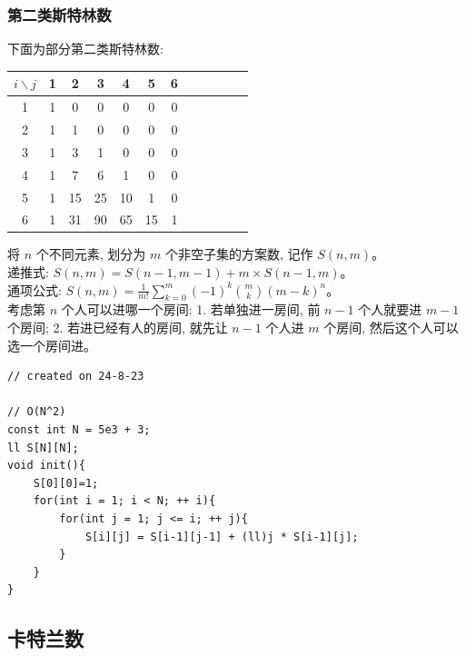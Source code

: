 \documentclass[a4paper,12pt]{article}
\begin{document}
\subsubsection{第二类斯特林数}

\noindent 下面为部分第二类斯特林数:

\begin{table}[ht]
    \centering
    \begin{tabular}{c|ccccccccccc}
      \( i \backslash j \) & 1 & 2 & 3 & 4 & 5 & 6 \\
      \hline
      1 & 1 & 0 & 0 & 0 & 0 & 0 \\
      2 & 1 & 1 & 0 & 0 & 0 & 0\\
      3 & 1 & 3 & 1 & 0 & 0 & 0\\
      4 & 1 & 7 & 6 & 1 & 0 & 0\\
      5 & 1 & 15 & 25 & 10 & 1 & 0 \\
      6 & 1 & 31 & 90 & 65 & 15 & 1 \\ 

    \end{tabular}
\end{table} 

\noindent 将 $n$ 个不同元素, 划分为 $m$ 个非空子集的方案数, 记作 $S(n,m)$。\\

\noindent 递推式: $S(n,m) = S(n-1,m-1) + m \times S(n-1,m)$。 \\

\noindent 通项公式: $S(n,m) = \frac{1}{m!} \sum_{k=0}^m (-1)^k \binom{m}{k} (m-k)^n$。 \\

\noindent 考虑第 $n$ 个人可以进哪一个房间: 1. 若单独进一房间, 前 $n-1$ 个人就要进 $m-1$ 个房间;
2. 若进已经有人的房间, 就先让 $n-1$ 个人进 $m$ 个房间, 然后这个人可以选一个房间进。\\

\begin{lstlisting}
// created on 24-8-23

// O(N^2)
const int N = 5e3 + 3;
ll S[N][N];
void init(){
    S[0][0]=1;
    for(int i = 1; i < N; ++ i){
        for(int j = 1; j <= i; ++ j){
            S[i][j] = S[i-1][j-1] + (ll)j * S[i-1][j];
        }
    }
}
\end{lstlisting}

\subsection{卡特兰数}
\end{document}
